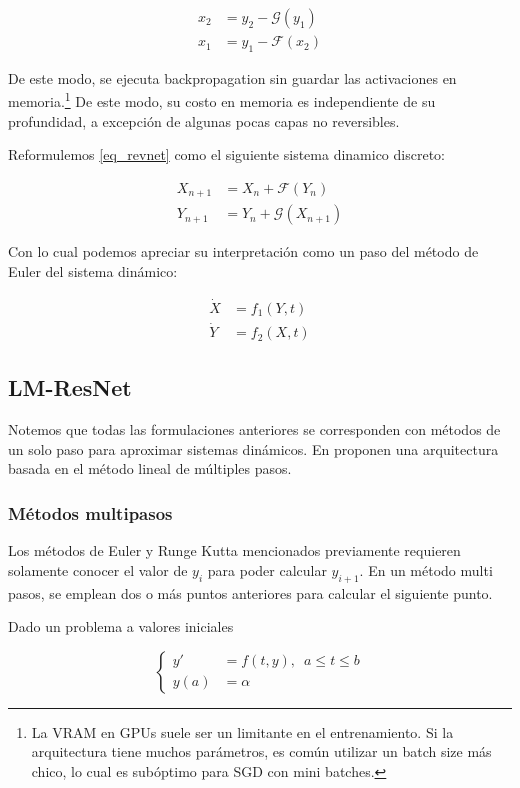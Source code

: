 \documentclass[titlepage,a4paper,oneside]{article}
\begin{document}
\begin{align}
	x_2 &= y_2 - \mathscr{G}(y_1) \\
	x_1 &= y_1 - \mathscr{F}(x_2)
\end{align}

De este modo, se ejecuta backpropagation sin guardar las activaciones en memoria.\footnote{La VRAM en GPUs suele ser un limitante en el entrenamiento. Si la arquitectura tiene muchos parámetros, es común utilizar un batch size más chico, lo cual es subóptimo para SGD con mini batches.} De este modo, su costo en memoria es independiente de su profundidad, a excepción de algunas pocas capas no reversibles.

Reformulemos \ref{eq_revnet} como el siguiente sistema dinamico discreto:

\begin{align}
	X_{n+1} &= X_n + \mathscr{F}(Y_n) \\
	Y_{n+1} &= Y_n + \mathscr{G}(X_{n+1})
\end{align}

Con lo cual podemos apreciar su interpretación como un paso del método de Euler del sistema dinámico:

\begin{align}
	\dot{X} &= f_1(Y, t) \\
	\dot{Y} &= f_2(X, t)
\end{align}

\subsection{LM-ResNet}
Notemos que todas las formulaciones anteriores se corresponden con métodos de un solo paso para aproximar sistemas dinámicos. En \cite{lu18d} proponen una arquitectura basada en el método lineal de múltiples pasos.

\subsubsection{Métodos multipasos}
Los métodos de Euler y Runge Kutta mencionados previamente requieren solamente conocer el valor de $y_i$ para poder calcular $y_{i+1}$. En un método multi pasos, se emplean dos o más puntos anteriores para calcular el siguiente punto.

Dado un problema a valores iniciales

\begin{equation}
\left\{ \begin{aligned}
		y\prime &= f(t,y), \enspace a \leq t \leq b\\
		y(a) &= \alpha
\end{aligned} \right.
\end{equation}
\end{document}

